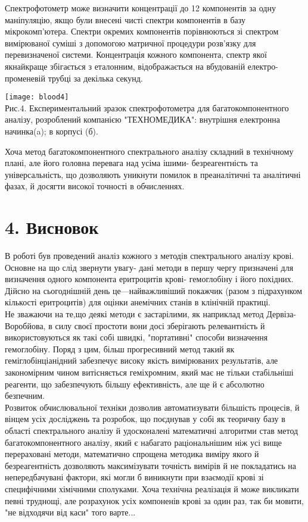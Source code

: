 \documentclass[14pt,a4paper]{scrartcl}
\begin{document}
Спектрофотометр може визначити концентрації до 12 компонентів за одну маніпуляцію, якщо були внесені чисті спектри компонентів в базу мікрокомп'ютера. Спектри окремих компонентів порівнюються зі спектром вимірюваної суміші з допомогою матричної процедури розв'язку для перевизначеної системи. Концентрація кожного компонента, спектр якої якнайкраще збігається з еталонним, відображається на вбудованій електро-променевій трубці за декілька секунд.
\newpage
\begin{center}
\small
\texttt{[image: blood4]}\\[0.3 cm]
Рис.4. Експериментальний зразок спектрофотометра для багатокомпонентного аналізу, розроблений компанією "ТЕХНОМЕДИКА": внутрішня електронна начинка(a); в корпусі (б). \cite{l7}\\
\end{center} 

Хоча метод багатокомпонентного спектрального аналізу складний в технічному плані, але його головна перевага над усіма ішими- безреагентність та універсальність, що дозволяють уникнути помилок в преаналітичні та аналітичні фазах, й досягти високої точності в обчисленнях.
\newpage
\section*{4. Висновок}
В роботі був проведений аналіз кожного з методів спектрального аналізу крові. Основне на що слід звернути увагу- дані методи в першу чергу призначені для визначення одного компонента еритроцитів крові- гемоглобіну і його похідних. Дійсно на сьогоднішній день це---найважливіший покажчик (разом з підрахунком кількості еритроцитів) для оцінки анемічних станів в клінічній практиці.\\

Не зважаючи на те,що деякі методи є застарілими, як наприклад метод Дервіза-Воробйова, в силу своєї простоти вони досі зберігають релевантність й використовуються як такі собі швидкі, "портативні" способи визначення гемоглобіну. Поряд з цим, більш прогресивний метод такий як геміглобінціанідний забезпечує високу якість вимірюваних результатів, але закономірним чином витісняється геміхромним, який має не тільки стабільніші реагенти, що забезпечують більшу ефективність, але ще й є абсолютно безпечним.\\

Розвиток обчислювальної техніки дозволив автоматизувати більшість процесів, й вінцем усіх досліджень та розробок, що поєднував у собі як теоричну базу в області спектрального аналізу й удосконалені математичні алгоритми став метод багатокомпонентного аналізу, який є набагато раціональнішим ніж усі вище перераховані методи, математично спрощена методика виміру якого й безреагентність дозволяють максимізувати точність вимірів й не покладатись на непередбачувані фактори, які могли б виникнути при взаємодії крові зі специфічними хімічними сполуками. Хоча технічна реалізація й може викликати певні труднощі, але розрахунок усіх компоненів крові за один раз, так би мовити, "не відходячи від каси" того варте...
\end{document}
